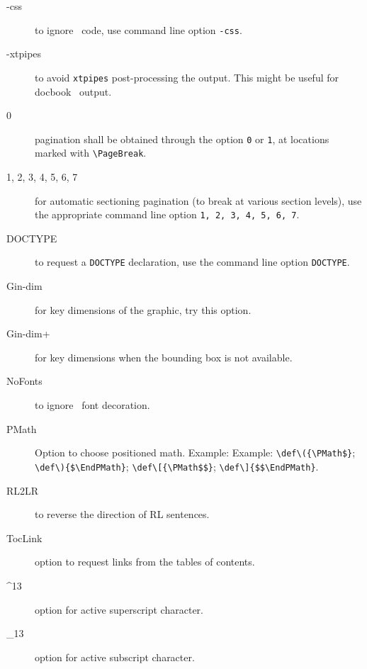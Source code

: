 \begin{description}

\item[-css] to ignore \css\ code, use command line option \verb=-css=.

\item[-xtpipes] to avoid \verb=xtpipes= post-processing the
  output. This might be useful for docbook \xml\ output.


\item[0] pagination shall be obtained through the option \verb=0= or
  \verb=1=, at locations marked with \verb=\PageBreak=.

\item[1, 2, 3, 4, 5, 6, 7] for automatic sectioning pagination (to
  break at various section levels), use the appropriate command line
  option \verb=1, 2, 3, 4, 5, 6, 7=.

\item[DOCTYPE] to request a \verb=DOCTYPE= declaration, use the
  command line option \verb=DOCTYPE=.

\item[Gin-dim] for key dimensions of the graphic, try this option.

\item[Gin-dim+] for key dimensions when the bounding box is not
  available.

\item[NoFonts] to ignore \css\ font decoration.

\item[PMath] Option to choose positioned math. Example: Example:
  \verb=\def\({\PMath$}=; \verb=\def\){$\EndPMath}=;
  \verb=\def\[{\PMath$$}=; \verb=\def\]{$$\EndPMath}=.

\item[RL2LR] to reverse the direction of RL sentences.


\item[TocLink] option to request links from the tables of contents.
  
\item[\textasciicircum 13] option for active superscript character.

\item[\_13] option for active subscript character.


\end{description}
